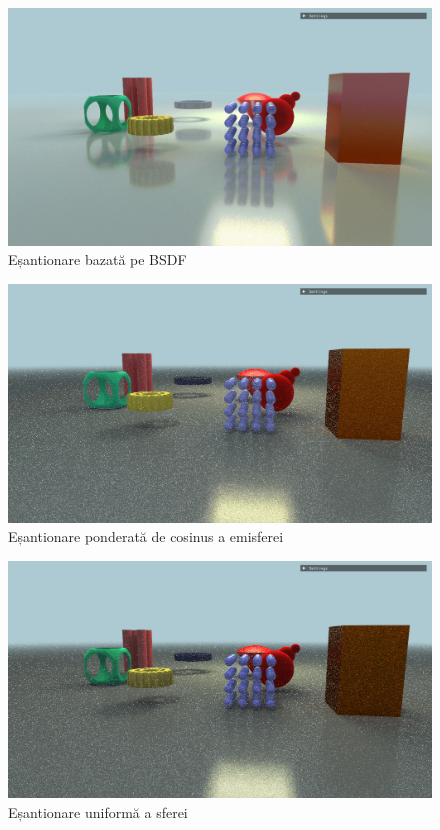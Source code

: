 \documentclass[12pt,a4paper]{report}
\numberwithin{equation}{section} %
\begin{document}
\begin{figure}[!htb]
	\centering
	\includegraphics[width=\textwidth]{pics/demo-bsdf.png}
	\caption{Eșantionare bazată pe BSDF}
	\label{fig:eval-bsdf}
\end{figure}
\begin{figure}[!htb]
	\centering
	\includegraphics[width=\textwidth]{pics/demo-cosine.png}
	\caption{Eșantionare ponderată de cosinus a emisferei}
	\label{fig:eval-cosine}
\end{figure}
\begin{figure}[!htb]
	\centering
	\includegraphics[width=\textwidth]{pics/demo-uniform.png}
	\caption{Eșantionare uniformă a sferei}
	\label{fig:eval-uniform}
\end{figure}
\end{document}

